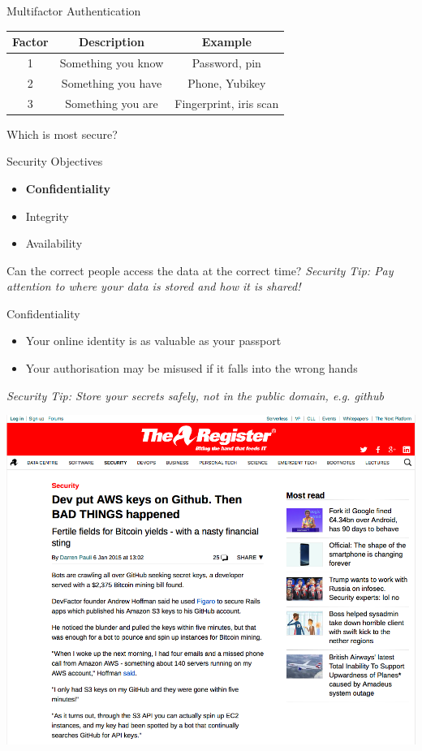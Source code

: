 \documentclass{beamer}
\begin{document}
\begin{frame}{Multifactor Authentication}
\begin{center}
\begin{tabular}{ |c|c|c| }
\hline
 \textbf{Factor} & \textbf{Description} & \textbf{Example}\\
\hline \hline
 1 & Something you know & Password, pin\\ \hline
 2 & Something you have & Phone, Yubikey \\  \hline
 3 & Something you are & Fingerprint, iris scan \\ \hline
\end{tabular}
\end{center}
Which is most secure?
\end{frame}


\begin{frame}{Security Objectives}
	\begin{itemize}
		\item \textbf{Confidentiality}
		\item Integrity
        \item Availability
	\end{itemize}
    Can the correct people access the data at the correct time?
	\linebreak
    \linebreak
    { \color{red} \textit{Security Tip: Pay attention to where your data is stored and how it is shared!} }
\end{frame}

\begin{frame}{Confidentiality}
\begin{itemize}
\item Your online identity is as valuable as your passport 
\item Your authorisation may be misused if it falls into the wrong hands
\end{itemize}
{ \color{red} \textit{Security Tip: Store your secrets safely, not in the public domain, e.g. github} }
\end{frame}

\begin{frame}{}
\begin{center}
\includegraphics[width=0.8\linewidth]{github-bitcoin.png}
\end{center}
\end{frame}
\end{document}
